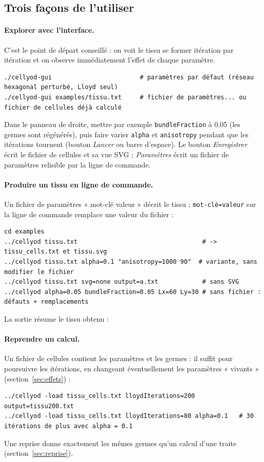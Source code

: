 \documentclass[10pt,a4paper]{article}
\newcommand{\code}[1]{\texttt{#1}}
\begin{document}
\subsection{Trois façons de l'utiliser}

\paragraph{Explorer avec l'interface.} C'est le point de départ conseillé : on voit le tissu se former
itération par itération et on observe immédiatement l'effet de chaque paramètre.
\begin{lstlisting}
./cellyod-gui                        # paramètres par défaut (réseau hexagonal perturbé, Lloyd seul)
./cellyod-gui examples/tissu.txt     # fichier de paramètres... ou fichier de cellules déjà calculé
\end{lstlisting}
Dans le panneau de droite, mettre par exemple \code{bundleFraction} à 0.05 (les germes sont régénérés),
puis faire varier \code{alpha} et \code{anisotropy} pendant que les itérations tournent (bouton \emph{Lancer}
ou barre d'espace). Le bouton \emph{Enregistrer} écrit le fichier de cellules et sa vue SVG ;
\emph{Paramètres} écrit un fichier de paramètres relisible par la ligne de commande.

\paragraph{Produire un tissu en ligne de commande.} Un fichier de paramètres « mot-clé valeur » décrit le
tissu ; \code{mot-clé=valeur} sur la ligne de commande remplace une valeur du fichier :
\begin{lstlisting}
cd examples
../cellyod tissu.txt                                  # -> tissu_cells.txt et tissu.svg
../cellyod tissu.txt alpha=0.1 "anisotropy=1000 90"  # variante, sans modifier le fichier
../cellyod tissu.txt svg=none output=a.txt            # sans SVG
../cellyod alpha=0.05 bundleFraction=0.05 Lx=60 Ly=30 # sans fichier : défauts + remplacements
\end{lstlisting}
La sortie résume le tissu obtenu :


\paragraph{Reprendre un calcul.} Un fichier de cellules contient les paramètres et les germes : il suffit pour
poursuivre les itérations, en changeant éventuellement les paramètres « vivants » (section~\ref{sec:effets}) :
\begin{lstlisting}
../cellyod -load tissu_cells.txt lloydIterations=200 output=tissu200.txt
../cellyod -load tissu_cells.txt lloydIterations=80 alpha=0.1   # 30 itérations de plus avec alpha = 0.1
\end{lstlisting}
Une reprise donne exactement les mêmes germes qu'un calcul d'une traite (section~\ref{sec:reprise}).
\end{document}
